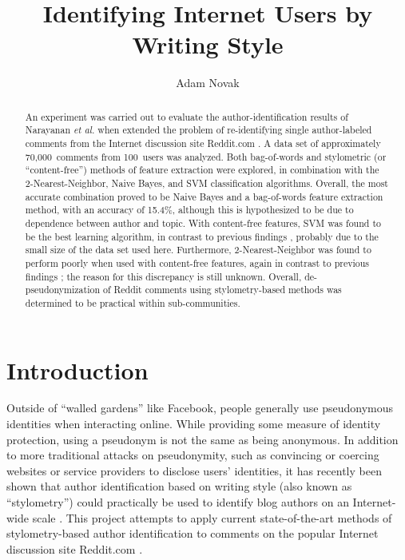 \documentclass[12pt]{article}
\author{Adam Novak}
\title{Identifying Internet Users by Writing Style}
\begin{document}
\maketitle

\begin{abstract}
An experiment was carried out to evaluate the author-identification results of Narayanan \textit{et al.} when extended the problem of re-identifying single author-labeled comments from the Internet discussion site Reddit.com \cite{narayanan2012feasibility, reddit2012reddit}. A data set of approximately 70,000~comments from 100~users was analyzed. Both bag-of-words and stylometric (or ``content-free'') methods of feature extraction were explored, in combination with the 2-Nearest-Neighbor, Naive Bayes, and SVM classification algorithms. Overall, the most accurate combination proved to be Naive Bayes and a bag-of-words feature extraction method, with an accuracy of 15.4\%, although this is hypothesized to be due to dependence between author and topic. With content-free features, SVM was found to be the best learning algorithm, in contrast to previous findings \cite{narayanan2012feasibility}, probably due to the small size of the data set used here. Furthermore, 2-Nearest-Neighbor was found to perform poorly when used with content-free features, again in contrast to previous findings \cite{narayanan2012feasibility}; the reason for this discrepancy is still unknown. Overall, de-pseudonymization of Reddit comments using stylometry-based methods was determined to be practical within sub-communities.
\end{abstract}

\section{Introduction}
Outside of ``walled gardens'' like Facebook, people generally use pseudonymous identities when interacting online. While providing some measure of identity protection, using a pseudonym is not the same as being anonymous. In addition to more traditional attacks on pseudonymity, such as convincing or coercing websites or service providers to disclose users' identities, it has recently been shown that author identification based on writing style (also known as ``stylometry'') could practically be used to identify blog authors on an Internet-wide scale \cite{narayanan2012feasibility}. This project attempts to apply current state-of-the-art methods of stylometry-based author identification to comments on the popular Internet discussion site Reddit.com \cite{reddit2012reddit}.
\end{document}
